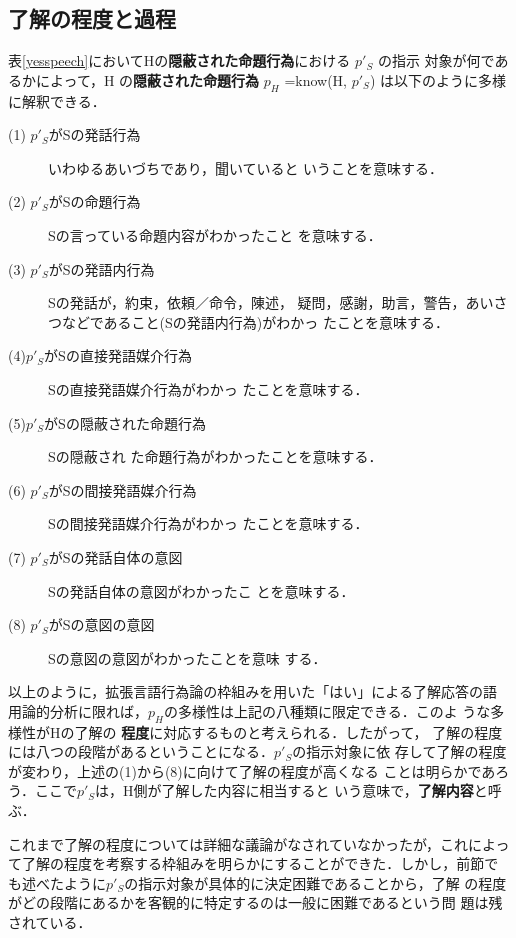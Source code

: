 \subsection{了解の程度と過程}

表\ref{yesspeech}においてHの{\bf 隠蔽された命題行為}における $p'_{S}$ の指示
対象が何であるかによって，H の{\bf 隠蔽された命題行為} $p_{H}$ =know(H,
$p'_{S}$) は以下のように多様に解釈できる．

\begin{description}
\item [(1) $p'_{S}$がSの発話行為] いわゆるあいづちであり，聞いていると
いうことを意味する．
\item [(2) $p'_{S}$がSの命題行為] Sの言っている命題内容がわかったこと
を意味する．
\item [(3) $p'_{S}$がSの発語内行為] Sの発話が，約束，依頼／命令，陳述，
疑問，感謝，助言，警告，あいさつなどであること(Sの発語内行為)がわかっ
たことを意味する．
\item [(4)$p'_{S}$がSの直接発語媒介行為] Sの直接発語媒介行為がわかっ
たことを意味する．
\item [(5)$p'_{S}$がSの隠蔽された命題行為] Sの隠蔽され
た命題行為がわかったことを意味する．
\item [(6) $p'_{S}$がSの間接発語媒介行為] Sの間接発語媒介行為がわかっ
たことを意味する．
\item [(7) $p'_{S}$がSの発話自体の意図] Sの発話自体の意図がわかったこ
とを意味する．
\item [(8) $p'_{S}$がSの意図の意図] Sの意図の意図がわかったことを意味
する．
\end{description}



以上のように，拡張言語行為論の枠組みを用いた「はい」による了解応答の語
用論的分析に限れば，$p_{H}$の多様性は上記の八種類に限定できる．このよ
うな多様性がHの了解の {\bf 程度}に対応するものと考えられる．したがって，
了解の程度には八つの段階があるということになる．$p'_{S}$の指示対象に依
存して了解の程度が変わり，上述の(1)から(8)に向けて了解の程度が高くなる
ことは明らかであろう．ここで$p'_{S}$は，H側が了解した内容に相当すると
いう意味で，{\bf 了解内容}と呼ぶ．

これまで了解の程度については詳細な議論がなされていなかったが，これによっ
て了解の程度を考察する枠組みを明らかにすることができた．しかし，前節で
も述べたように$p'_{S}$の指示対象が具体的に決定困難であることから，了解
の程度がどの段階にあるかを客観的に特定するのは一般に困難であるという問
題は残されている．

